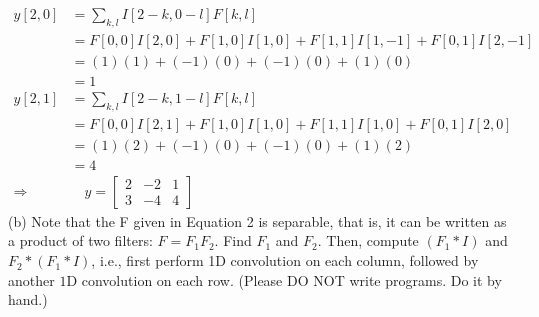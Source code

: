\documentclass[english,a4paper,12pt]{article}
\begin{document}
\begin{enumerate}
{$$
\begin{aligned}
y[2,0] &=\sum_{k, l} I[2-k, 0-l] F[k, l] \\
&=F[0,0] I[2,0]+F[1,0] I[1,0]+F[1,1] I[1,-1]+F[0,1] I[2,-1] \\
&=(1)(1)+(-1)(0)+(-1)(0)+(1)(0) \\
&=1 \\
y[2,1] &=\sum_{k, l} I[2-k, 1-l] F[k, l] \\
&=F[0,0] I[2,1]+F[1,0] I[1,0]+F[1,1] I[1,0]+F[0,1] I[2,0] \\
&=(1)(2)+(-1)(0)+(-1)(0)+(1)(2) \\
&=4 \\
\Rightarrow & \quad y =\left[\begin{array}{ccc}
2 & -2 & 1 \\
3 & -4 & 4
\end{array}\right]
\end{aligned}
$$
(b) Note that the F given in Equation 2 is separable, that is, it can be written as a product of two filters: $F=F_{1} F_{2}$. Find $F_{1}$ and $F_{2}$. Then, compute $\left(F_{1} * I\right)$ and $F_{2} *\left(F_{1} * I\right)$, i.e., first perform 1D convolution on each column, followed by another $1 \mathrm{D}$ convolution on each row. (Please $\mathrm{DO}$ NOT write programs. Do it by hand.) \\ 

}
\end{enumerate}
\end{document}

